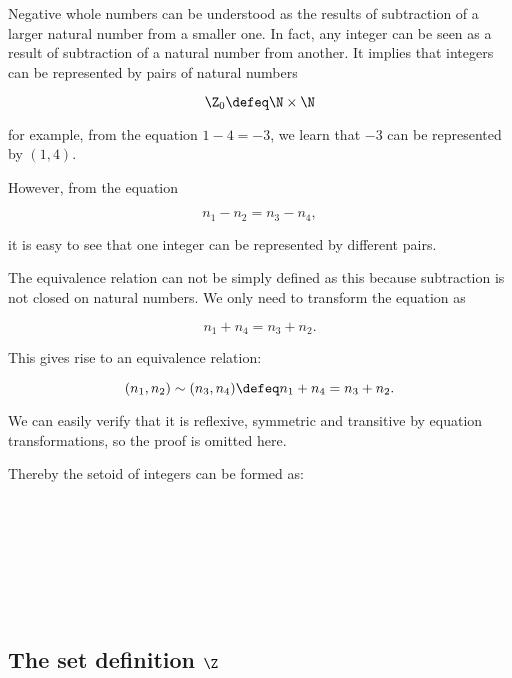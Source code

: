 Negative whole numbers can be understood as the results
of subtraction of a larger natural number from a smaller one. In fact, any integer can be seen as a result of subtraction of a natural number from another. It implies that integers can be represented by pairs of natural numbers


$$\Z_0 \defeq \N \times \N$$

for example, from the equation $1 - 4 = - 3$, we learn that $- 3$ can be represented by $(1,4)$.

However, from the equation

$$n_1 - n_2 = n_3 - n_4,$$

it is easy to see that one integer can be represented by different pairs.

The equivalence relation can not be simply defined as this because subtraction is not closed on natural numbers. We only need to transform the equation as

$$ n_1 + n_4 = n_3 + n_2.$$

This gives rise to an equivalence relation:


$$(n_1,n_2) \sim (n_3,n_4) \defeq  n_1 + n_4 = n_3 + n_2.$$

We can easily verify that it is reflexive, symmetric and
transitive by equation transformations, so the proof is omitted here.

Thereby the setoid of integers can be formed as:

\begin{code}
\\
\> \AgdaSymbol{:} \<%
\\
\> \AgdaSymbol{=} \<%
\\
\>[2]\<[3]%
\>[3]\AgdaSymbol{\{}  \<[19]%
\>[19]\AgdaSymbol{=} \<%
\\
\>[2]\<[3]%
\>[3]\AgdaSymbol{;}  \<[19]%
\>[19]\AgdaSymbol{=} \<%
\\
\>[2]\<[3]%
\>[3]\AgdaSymbol{;}  \AgdaSymbol{=} \<%
\\
\>[2]\<[3]%
\>[3]\AgdaSymbol{\}}\<%
\end{code}

\subsection{The set definition $\Z$}

